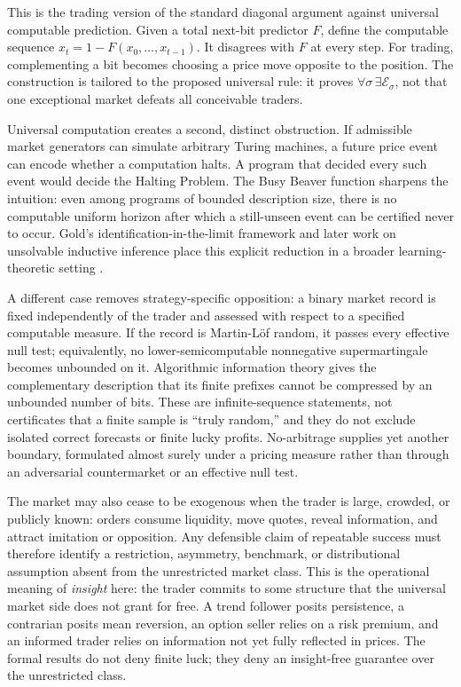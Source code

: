 \documentclass[aps,pra,reprint,superscriptaddress,amsmath,amssymb,floatfix]{revtex4-2}
\theoremstyle{plain}
\theoremstyle{definition}
\theoremstyle{remark}
\begin{document}
This is the trading version of the standard diagonal argument against
universal computable prediction. Given a total next-bit predictor \(F\), define
the computable sequence \(x_t=1-F(x_0,\ldots,x_{t-1})\). It disagrees with
\(F\) at every step. For trading, complementing a bit becomes choosing a price
move opposite to the position. The construction is tailored to the proposed
universal rule: it proves \(\forall\sigma\,\exists\mathcal E_\sigma\), not that
one exceptional market defeats all conceivable traders.

Universal computation creates a second, distinct obstruction. If admissible
market generators can simulate arbitrary Turing machines, a future price event
can encode whether a computation halts. A program that decided every such
event would decide the Halting Problem. The Busy Beaver function sharpens the
intuition: even among programs of bounded description size, there is no
computable uniform horizon after which a still-unseen event can be certified
never to occur. Gold's
identification-in-the-limit framework and later work on unsolvable inductive
inference place this explicit reduction in a broader learning-theoretic setting
\cite{go-67,ad-91,angluin:83,2016-AlexanderKarlSvozil-ml,moore}.

A different case removes strategy-specific opposition: a binary market record
is fixed independently of the trader and assessed with respect to a specified
computable measure. If the record is Martin-L\"of random, it passes every
effective null test; equivalently, no lower-semicomputable nonnegative
supermartingale becomes unbounded on it. Algorithmic information theory gives
the complementary description that its finite prefixes cannot be compressed
by an unbounded number of bits. These are infinite-sequence statements, not
certificates that a finite sample is ``truly random,'' and they do not exclude
isolated correct forecasts or finite lucky profits. No-arbitrage supplies yet
another boundary, formulated almost surely under a pricing measure rather than
through an adversarial countermarket or an effective null test.

The market may also cease to be exogenous when the trader is large, crowded,
or publicly known: orders consume liquidity, move quotes, reveal information,
and attract imitation or opposition. Any defensible claim of repeatable
success must therefore identify a restriction, asymmetry, benchmark, or
distributional assumption absent from the unrestricted market class. This is
the operational meaning of \emph{insight} here: the trader commits to some
structure that the universal market side does not grant for free. A trend
follower posits persistence, a contrarian posits mean reversion, an option
seller relies on a risk premium, and an informed trader relies on information
not yet fully reflected in prices. The formal results do not deny finite luck;
they deny an insight-free guarantee over the unrestricted class.
\end{document}
